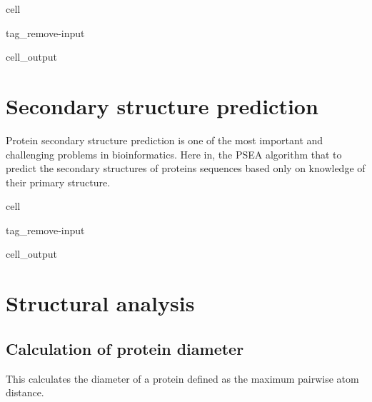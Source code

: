 \documentclass[letterpaper,10pt,english]{jupyterBook}
\begin{document}
\begin{sphinxuseclass}{cell}
\begin{sphinxuseclass}{tag_remove-input}\begin{sphinxVerbatimOutput}

\begin{sphinxuseclass}{cell_output}
\noindent{}

\end{sphinxuseclass}\end{sphinxVerbatimOutput}

\end{sphinxuseclass}
\end{sphinxuseclass}

\section{Secondary structure prediction}
\label{\detokenize{ipynb/chapter1:secondary-structure-prediction}}
\sphinxAtStartPar
Protein secondary structure prediction is one of the most important and challenging problems in bioinformatics. Here in, the P\sphinxhyphen{}SEA algorithm that to predict the secondary structures of proteins sequences based only on knowledge of their primary structure.

\begin{sphinxuseclass}{cell}
\begin{sphinxuseclass}{tag_remove-input}\begin{sphinxVerbatimOutput}

\begin{sphinxuseclass}{cell_output}
\noindent{}

\end{sphinxuseclass}\end{sphinxVerbatimOutput}

\end{sphinxuseclass}
\end{sphinxuseclass}

\section{Structural analysis}
\label{\detokenize{ipynb/chapter1:structural-analysis}}

\subsection{Calculation of protein diameter}
\label{\detokenize{ipynb/chapter1:calculation-of-protein-diameter}}
\sphinxAtStartPar
This calculates the diameter of a protein defined as the maximum pairwise atom distance.
\end{document}
